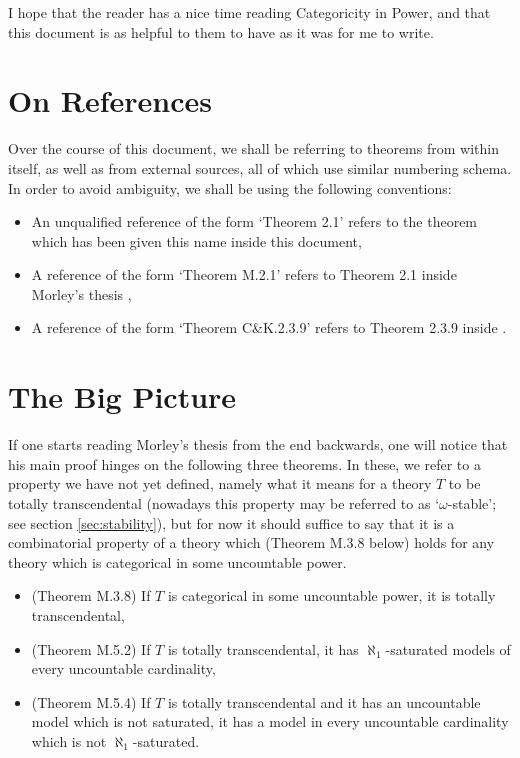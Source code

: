 \documentclass{article}
\theoremstyle{nonumberplain}
\begin{document}
I hope that the reader has a nice time reading Categoricity in Power, and that this document is as helpful to them to have as it was for me to write.

\section{On References}

Over the course of this document, we shall be referring to theorems from within itself, as well as from external sources, all of which use similar numbering schema. In order to avoid ambiguity, we shall be using the following conventions:
\begin{itemize}
\item An unqualified reference of the form `Theorem 2.1' refers to the theorem which has been given this name inside this document,
\item A reference of the form `Theorem M.2.1' refers to Theorem 2.1 inside Morley's thesis \cite{morley},
\item A reference of the form `Theorem C\&K.2.3.9' refers to Theorem 2.3.9 inside \cite{cnk}.
\end{itemize}

\section{The Big Picture}\label{sec:bigpicture}

If one starts reading Morley's thesis from the end backwards, one will notice that his main proof hinges on the following three theorems. In these, we refer to a property we have not yet defined, namely what it means for a theory $T$ to be totally transcendental (nowadays this property may be referred to as `$\omega$-stable'; see section \ref{sec:stability}), but for now it should suffice to say that it is a combinatorial property of a theory which (Theorem M.3.8 below) holds for any theory which is categorical in some uncountable power.

\begin{itemize}
\item (Theorem M.3.8) If $T$ is categorical in some uncountable power, it is totally transcendental,
\item (Theorem M.5.2) If $T$ is totally transcendental, it has $\aleph_1$-saturated models of every uncountable cardinality,
\item (Theorem M.5.4) If $T$ is totally transcendental and it has an uncountable model which is not saturated, it has a model in every uncountable cardinality which is not $\aleph_1$-saturated.
\end{itemize}
\end{document}
